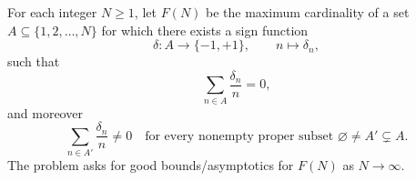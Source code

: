 For each integer $N\ge 1$, let $F(N)$ be the maximum cardinality of a set $A\subseteq \{1,2,\dots,N\}$ for which there exists a sign function
\[
\delta:A\to\{-1,+1\},\qquad n\mapsto \delta_n,
\]
such that
\[
\sum_{n\in A}\frac{\delta_n}{n}=0,
\]
and moreover
\[
\sum_{n\in A'}\frac{\delta_n}{n}\neq 0
\quad\text{for every nonempty proper subset } \varnothing\neq A'\subsetneq A.
\]
The problem asks for good bounds/asymptotics for $F(N)$ as $N\to\infty$.
